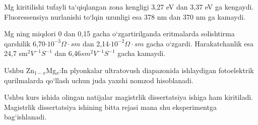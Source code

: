 \documentclass[14pt]{article}
\begin{document}
	Mg kiritilishi tufayli ta`qiqlangan zona kengligi 3,27 eV dan 3,37 eV ga kengaydi. Fluoressensiya nurlanishi to`lqin uzunligi esa 378 nm dan 370 nm ga kamaydi. 
	
	Mg ning miqdori 0 dan 0,15 gacha o`zgartirilganda eritmalarda solishtirma qarshilik 6,70$\cdot 10^{-3}\Omega\cdot sm$ dan 2,14$\cdot 10^{-2}\Omega\cdot sm$ gacha o`zgardi. Harakatchanlik esa 24,7 sm$^{2}V^{-1}S^{-1}$ dan 6,46$sm^{2}V^{-1}S^{-1}$ gacha kamaydi. 
	
	Ushbu Zn$_{1-x}$Mg$_{x}$:In plyonkalar ultratovush diapazonida ishlaydigan fotoelektrik qurilmalarda qo`llash uchun juda yaxshi nomzod hisoblanadi.
	
	Ushbu kurs ishida olingan natijalar magistrlik dissertatsiya ishiga ham kiritiladi. Magistrlik dissertatsiya ishining bitta rejasi mana shu eksperimentga bag`ishlanadi.
	
\end{document}
